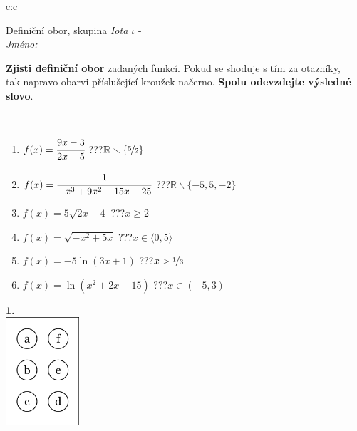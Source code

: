 \documentclass[10pt]{report}
\begin{document}
\begin{tabular}{c:c}
\begin{minipage}[c][104.5mm][t]{0.5\linewidth}
\begin{center}
\vspace{7mm}
{\huge Definiční obor, skupina \textit{Iota $\iota$} -}\\[5mm]
\textit{Jméno:}\phantom{xxxxxxxxxxxxxxxxxxxxxxxxxxxxxxxxxxxxxxxxxxxxxxxxxxxxxxxxxxxxxxxxx}\\[5mm]
\begin{minipage}{0.95\linewidth}
\begin{center}
\textbf{Zjisti definiční obor} zadaných funkcí. Pokud se shoduje s tím za otazníky,\\tak napravo obarvi příslušející kroužek načerno. \textbf{Spolu odevzdejte výsledné slovo}.
\end{center}
\end{minipage}
\\[1mm]
\begin{minipage}{0.79\linewidth}
\begin{center}
\begin{varwidth}{\linewidth}
\begin{enumerate}
\normalsizerrr
\item $f(x)=\cfrac{9x-3}{2x-5}$\quad \dotfill\; ???\;\dotfill \quad $\mathbb{R}\smallsetminus\{\nicefrac{5}{2}\}$
\item $f(x)=\cfrac{1}{-x^3+9x^2-15x-25}$\quad \dotfill\; ???\;\dotfill \quad $\mathbb{R}\smallsetminus\{-5,5,-2\}$
\item $f(x)=5\sqrt{2x-4}$\quad \dotfill\; ???\;\dotfill \quad $x\geq2$
\item $f(x)=\sqrt{-x^2+5x}$\quad \dotfill\; ???\;\dotfill \quad $x\in\langle0 , 5\rangle$
\item $f(x)=-5\ln{(3x+1)}$\quad \dotfill\; ???\;\dotfill \quad $x>\nicefrac{1}{3}$
\item $f(x)=\ln{(x^2+2x-15)}$\quad \dotfill\; ???\;\dotfill \quad $x\in(-5 , 3)$
\end{enumerate}
\end{varwidth}
\end{center}
\end{minipage}
\begin{minipage}{0.20\linewidth}
\begin{center}
{\Huge\bfseries 1.} \\[2mm]
\includegraphics[height=40mm]{../images/braille.png}

\end{center}
\end{minipage}
\end{center}
\end{minipage}
\end{tabular}
\end{document}
